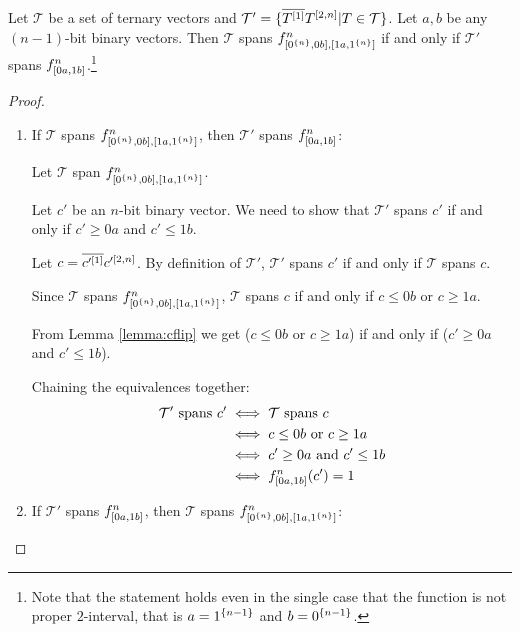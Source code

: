 \begin{lemma}
\label{lemma:tflip}
Let $\mathcal{T}$ be a set of ternary vectors
and $\mathcal{T}'
= \{\overline{T^{[1]}} T^{[2, n]}
|T \in \mathcal{T}\}$.
Let $a, b$ be any $(n-1)$-bit binary vectors.
Then $\mathcal{T}$ spans $f^{n}_{[0^{\{n\}}, 0 b], [1 a, 1^{\{n\}}]}$
if and only if
$\mathcal{T}'$ spans
$f^{n}_{[0 a, 1 b]}$.\footnote{Note that
the statement holds even in the single case that
the function is not proper $2$-interval,
that is $a = 1^{\{n-1\}}$ and $b = 0^{\{n-1\}}$.}
\end{lemma}

\begin{proof}
\hfill %
\begin{enumerate}
\item
If $\mathcal{T}$ spans $f^{n}_{[0^{\{n\}}, 0 b], [1 a, 1^{\{n\}}]}$,
then $\mathcal{T}'$ spans $f^{n}_{[0 a, 1 b]}$:

Let $\mathcal{T}$ span $f^{n}_{[0^{\{n\}}, 0 b], [1 a, 1^{\{n\}}]}$.

Let $c'$ be an $n$-bit binary vector.
We need to show that
$\mathcal{T}'$ spans $c'$
if and only if
$c' \geq 0 a$ and $c' \leq 1 b$.

Let $c = \overline{c'^{[1]}} c'^{[2, n]}$.
By definition of $\mathcal{T}'$,
$\mathcal{T}'$ spans $c'$
if and only if
$\mathcal{T}$ spans $c$.

Since $\mathcal{T}$ spans
$f^{n}_{[0^{\{n\}}, 0 b], [1 a, 1^{\{n\}}]}$,
$\mathcal{T}$ spans $c$
if and only if
$c \leq 0 b$ or $c \geq 1 a$.

From Lemma \ref{lemma:cflip}
we get ($c \leq 0 b$ or $c \geq 1 a$)
if and only if
($c' \geq 0 a$ and $c' \leq 1 b$).

Chaining the equivalences together:
\begin{align*}
\mathcal{T}' \text{ spans } c' &\iff \mathcal{T} \text{ spans } c \\
&\iff c \leq 0 b \text{ or } c \geq 1 a \\
&\iff c' \geq 0 a \text{ and } c' \leq 1 b \\
&\iff f^{n}_{[0 a, 1 b]}(c') = 1
\end{align*}

\item
If $\mathcal{T}'$ spans $f^{n}_{[0 a, 1 b]}$,
then $\mathcal{T}$ spans $f^{n}_{[0^{\{n\}}, 0 b], [1 a, 1^{\{n\}}]}$:


\end{enumerate}
\end{proof}
